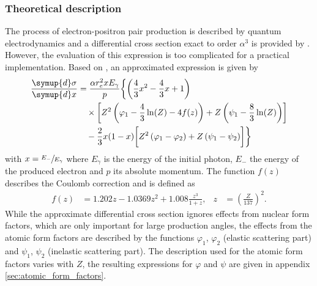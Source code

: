 \subsubsection{Theoretical description}

The process of electron-positron pair production is described by quantum electrodynamics and a differential cross section exact to order $\alpha^3$ is provided by \cite{RevModPhys.46.815}.
However, the evaluation of this expression is too complicated for a practical implementation.
Based on \cite[][Eq.~3.9]{RevModPhys.46.815}, an approximated expression is given by
%
\begin{equation}
	\label{eqn:crosssection_pairproduction}
	\begin{split}
	\frac{\symup{d}\sigma}{\symup{d}x} &= \frac{\alpha r_e^2 x E_{\gamma}}{p} \biggl\{ \left(\frac{4}{3} x^2 - \frac{4}{3} x + 1 \right) \\ &\quad\times \biggl[ Z^2 \left(\varphi_1 - \frac{4}{3} \ln(Z) - 4f(z) \right) + Z \left( \psi_1 - \frac{8}{3} \ln(Z) \right) \biggr]  \\ &\quad- \frac{2}{3} x (1 - x) \biggl[ Z^2 \left(\varphi_1 - \varphi_2\right) + Z \left(\psi_1 - \psi_2\right) \biggr] \biggr\}
	\end{split}
\end{equation}
%
with $x = \sfrac{E_{-}}{E_{\gamma}}$ where $E_{\gamma}$ is the energy of the initial photon, $E_-$ the energy of the produced electron and $p$ its absolute momentum.
The function $f(z)$ describes the Coulomb correction and is defined as
%
\begin{align}
	f(z) &= 1.202 z - 1.0369 z^2 + 1.008 \frac{z^3}{1+z}, & z &= \left(\frac{Z}{137}\right)^2.
\end{align}
%
While the approximate differential cross section ignores effects from nuclear form factors, which are only important for large production angles, the effects from the atomic form factors are described by the functions $\varphi_1$, $\varphi_2$ (elastic scattering part) and $\psi_1$, $\psi_2$ (inelastic scattering part).
The description used for the atomic form factors varies with $Z$, the resulting expressions for $\varphi$ and $\psi$ are given in appendix \ref{sec:atomic_form_factors}.

